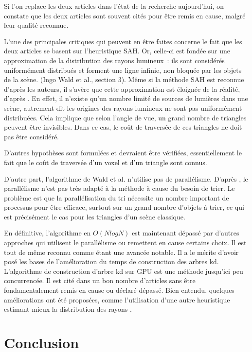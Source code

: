 \documentclass[a4paper]{article}
\begin{document}
Si l'on replace les deux articles dans l'état de la recherche aujourd'hui, on constate que les deux articles sont souvent cités pour être remis en cause, malgré leur qualité reconnue. 

L'une des principales critiques qui peuvent en être faites concerne le fait que les deux articles se basent sur l'heuristique SAH. Or, celle-ci est fondée sur une approximation de la distribution des rayons lumineux~: ils sont considérés uniformément distribués et forment une ligne infinie, non bloquée par les objets de la scène. (Ingo Wald et al., section 3). Même si la méthode SAH est reconnue d'après les auteurs, il s'avère que cette approximation est éloignée de la réalité, d'après \cite{anti-sah}. En effet, il n'existe qu'un nombre limité de sources de lumières dans une scène, autrement dit les origines des rayons lumineux ne sont pas uniformément distribuées. Cela implique que selon l'angle de vue, un grand nombre de triangles peuvent être invisibles. Dans ce cas, le coût de traversée de ces triangles ne doit pas être considéré.

D'autres hypothèses sont formulées et devraient être vérifiées, essentiellement le fait que le coût de traversée d'un voxel et d'un triangle sont connus.

D'autre part, l'algorithme de Wald et al. n'utilise pas de parallélisme. D'après \cite{parallel-cpu}, le parallélisme n'est pas très adapté à la méthode à cause du besoin de trier. Le problème est que la parallélisation du tri nécessite un nombre important de processus pour être efficace, surtout sur un grand nombre d'objets à trier, ce qui est précisément le cas pour les triangles d'un scène classique.

En définitive, l'algorithme en $O(NlogN)$ est maintenant dépassé par d'autres approches qui utilisent le parallélisme ou remettent en cause certains choix. Il est tout de même reconnu comme étant une avancée notable. Il a le mérite d'avoir posé les bases de l'amélioration du temps de construction des arbres kd.
L'algorithme de construction d'arbre kd sur GPU est une méthode jusqu'ici peu concurrencée. Il est cité dans un bon nombre d'articles sans être fondamentalement remis en cause ou déclaré dépassé. Bien entendu, quelques améliorations ont été proposées, comme l'utilisation d'une autre heuristique estimant mieux la distribution des rayons \cite{anti-sah}.

\section{Conclusion}
\end{document}
